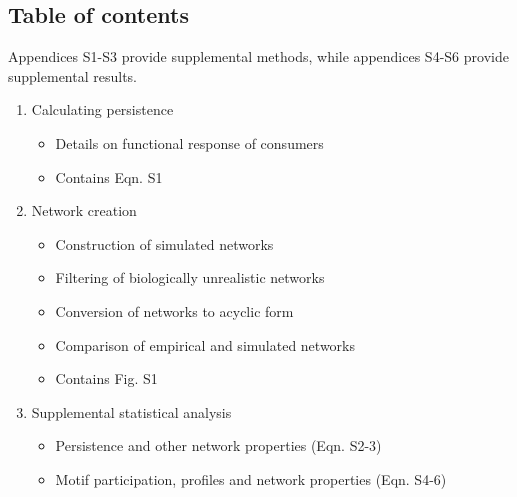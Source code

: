 \documentclass[12pt]{article}
\begin{document}
\setlength{\parindent}{15pt} 
\begin{spacing}{2.0}

\clearpage

\section*{Table of contents}
    {\footnotesize
    \begin{spacing}{1.0}

    Appendices S1-S3 provide supplemental methods, while appendices S4-S6 provide supplemental results.

    \begin{enumerate}
    
        \item Calculating persistence

            \begin{itemize}
                \item Details on functional response of consumers
                \item Contains Eqn. S1
            \end{itemize}    
            

        \item Network creation \\
        
            \begin{itemize}
            \item Construction of simulated networks
            \item Filtering of biologically unrealistic networks 
            \item Conversion of networks to acyclic form
            \item Comparison of empirical and simulated networks
            \item Contains Fig. S1
            \end{itemize}
            
            
        \item Supplemental statistical analysis

            \begin{itemize}
                \item Persistence and other network properties (Eqn. S2-3)
                \item Motif participation, profiles and network properties (Eqn. S4-6)
            \end{itemize}
                


\end{enumerate}
\end{spacing}}
\end{spacing}
\end{document}
